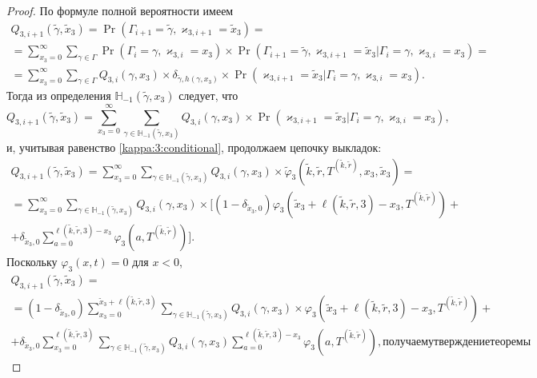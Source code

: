\begin{proof}
По формуле полной вероятности имеем
\begin{multline*}
Q_{3, i+1}(\tilde{\gamma}, \tilde{x}_3) = \Pr(\Gamma_{i+1}=\tilde{\gamma},  \varkappa_{3, i+1}=\tilde{x}_3) = \\
= \sum_{x_3=0}^{\infty}\sum_{\gamma \in \Gamma} \Pr(\Gamma_{i}=\gamma,  \varkappa_{3, i}=x_3) \times \Pr(\Gamma_{i+1}=\tilde{\gamma},  \varkappa_{3, i+1}=\tilde{x}_3 | \Gamma_{i}=\gamma,  \varkappa_{3, i}=x_3) =  \\ 
= \sum_{x_3=0}^{\infty}\sum_{\gamma \in \Gamma} Q_{3, i}(\gamma, x_3) \times \delta_{\tilde{\gamma}, h(\gamma, x_3)}\times
\Pr(\varkappa_{3, i+1}=\tilde{x}_3 | \Gamma_{i}=\gamma,  \varkappa_{3, i}=x_3).
\end{multline*}
Тогда из определения $ {\mathbb H}_{-1}(\tilde{\gamma}, x_3)$ следует,  что 
\begin{equation*}
Q_{3, i+1}(\tilde{\gamma}, \tilde{x}_3) =\sum_{x_3=0}^{\infty}\sum_{\gamma \in {\mathbb H}_{-1}(\tilde{\gamma}, x_3)} Q_{3, i}(\gamma, x_3) \times 
\Pr(\varkappa_{3, i+1}=\tilde{x}_3 | \Gamma_{i}=\gamma,  \varkappa_{3, i}=x_3),
\end{equation*}
и, учитывая равенство \eqref{kappa:3:conditional}, продолжаем цепочку выкладок:
\begin{multline*}
Q_{3, i+1}(\tilde{\gamma}, \tilde{x}_3)= \sum_{x_3=0}^{\infty}\sum_{\gamma \in {\mathbb H}_{-1}(\tilde{\gamma}, x_3)} Q_{3, i}(\gamma, x_3) \times 
\tilde{\varphi}_3(\tilde{k}, \tilde{r},  T^{(\tilde{k}, \tilde{r})}, x_3, \tilde{x}_3) = \\
= \sum_{x_3=0}^{\infty}\sum_{\gamma \in {\mathbb H}_{-1}(\tilde{\gamma}, x_3)} Q_{3, i}(\gamma, x_3) \times 
[ (1-\delta_{\tilde{x}_3, 0})\varphi_3(\tilde{x}_3 + \ell(\tilde{k}, \tilde{r}, 3) - x_3, T^{(\tilde{k}, \tilde{r})}) + \\ 
+\delta_{\tilde{x}_3, 0} \sum_{a=0}^{\ell(\tilde{k}, \tilde{r}, 3)-x_3}\varphi_3(a, T^{(\tilde{k}, \tilde{r})})].
\end{multline*}
Поскольку  $\varphi_3(x, t)=0$ для $x<0$,  
\begin{multline*}
Q_{3, i+1}(\tilde{\gamma}, \tilde{x}_3)=\\
=(1-\delta_{\tilde{x}_3, 0}) \sum_{x_3=0}^{\tilde{x}_3 +  \ell(\tilde{k}, \tilde{r}, 3)}\sum_{\gamma \in {\mathbb H}_{-1}(\tilde{\gamma}, x_3)} Q_{3, i}(\gamma, x_3) \times 
\varphi_3(\tilde{x}_3 + \ell(\tilde{k}, \tilde{r}, 3) - x_3, T^{(\tilde{k}, \tilde{r})}) + \\
+ \delta_{\tilde{x}_3, 0} \sum_{x_3=0}^{\ell(\tilde{k}, \tilde{r}, 3)}\sum_{\gamma \in {\mathbb H}_{-1}(\tilde{\gamma}, x_3)} Q_{3, i}(\gamma, x_3) \sum_{a=0}^{\ell(\tilde{k}, \tilde{r}, 3) - x_3} \varphi_3(a, T^{(\tilde{k}, \tilde{r})}),
получаем утверждение теоремы
\end{multline*}
\end{proof}
